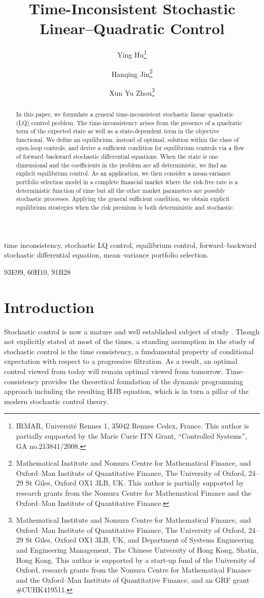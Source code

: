 \documentclass[final]{siamltex}
\title{{Time-Inconsistent Stochastic Linear--Quadratic Control}}
\author{Ying Hu\thanks{IRMAR,
Universit\'e Rennes 1, 35042 Rennes Cedex, France. This author is  partially supported by
the Marie Curie ITN Grant, ``Controlled Systems'', GA no.213841/2008.} \and
Hanqing Jin\thanks{Mathematical Institute and Nomura Centre for Mathematical Finance, and
Oxford--Man Institute of Quantitative Finance, The University of
Oxford, 24--29 St Giles, Oxford OX1 3LB, UK. This author is  partially supported by  research
grants from the Nomura Centre for
Mathematical Finance and the Oxford--Man Institute of Quantitative Finance.} \and
Xun Yu Zhou\thanks{Mathematical Institute and Nomura Centre for Mathematical Finance, and
Oxford--Man Institute of Quantitative Finance, The University of
Oxford, 24--29 St Giles, Oxford OX1 3LB, UK, and Department of
Systems Engineering and Engineering Management, The Chinese
University of Hong Kong, Shatin, Hong Kong. This author is supported by  a start-up fund of the University of Oxford, research
grants from the Nomura Centre for
Mathematical Finance and the Oxford--Man Institute of Quantitative Finance, and an GRF grant \#CUHK419511.}}
\begin{document}
\maketitle

\begin{abstract}
In this paper, we formulate a general time-inconsistent stochastic linear--quadratic (LQ) control problem.
The time-inconsistency arises from the presence of a quadratic term of the expected state as well as  a state-dependent term in the objective functional.
We define an equilibrium, instead of optimal, solution  within the class of open-loop controls, and derive a sufficient condition for equilibrium controls
via
a flow  of forward--backward
stochastic differential equations. When the state is one dimensional and the coefficients in the problem are all deterministic,
we find an explicit equilibrium control. As an application, we then consider a mean-variance portfolio selection model
in a complete financial market where the risk-free rate is a deterministic function of time but all the other market parameters are possibly stochastic
processes. Applying the general sufficient condition,
we obtain explicit equilibrium strategies when the risk premium  is both deterministic and stochastic.
\end{abstract}

\begin{keywords} 
time inconsistency, stochastic LQ control, equilibrium control, forward--backward stochastic differential equation,
mean--variance portfolio selection.
\end{keywords}

\begin{AMS}
93E99, 60H10, 91B28
\end{AMS}

\pagestyle{myheadings}
\thispagestyle{plain}

\section{Introduction}\label{introduction}

Stochastic control is now a mature and well established subject of study \cite{FS,YZ}. Though not explicitly stated at most of the times, a standing assumption
in the study of  stochastic control  is the time consistency, a fundamental property of
conditional expectation with respect to a progressive filtration. As a result, an optimal control viewed from today will remain optimal viewed from tomorrow.
Time-consistency provides the theoretical foundation of the dynamic programming approach including the resulting HJB equation, which is in turn
a pillar of the modern stochastic control theory.
\end{document}
